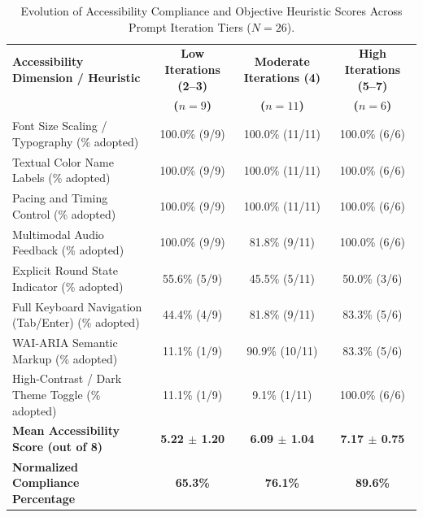 \documentclass{cleiej}
\begin{document}
\begin{table}[t]
\centering
\caption{Evolution of Accessibility Compliance and Objective Heuristic Scores Across Prompt Iteration Tiers ($N = 26$).}
\label{tab:prompt_evolution}
\small
\begin{tabularx}{\textwidth}{p{5.2cm} c c c}
\toprule
\textbf{Accessibility Dimension / Heuristic} & \textbf{Low Iterations (2--3)} & \textbf{Moderate Iterations (4)} & \textbf{High Iterations (5--7)} \\
& \textbf{($n = 9$)} & \textbf{($n = 11$)} & \textbf{($n = 6$)} \\
\midrule
Font Size Scaling / Typography (\% adopted)   & 100.0\% (9/9)   & 100.0\% (11/11) & 100.0\% (6/6) \\
Textual Color Name Labels (\% adopted)        & 100.0\% (9/9)   & 100.0\% (11/11) & 100.0\% (6/6) \\
Pacing and Timing Control (\% adopted)        & 100.0\% (9/9)   & 100.0\% (11/11) & 100.0\% (6/6) \\
Multimodal Audio Feedback (\% adopted)        & 100.0\% (9/9)   & 81.8\% (9/11)   & 100.0\% (6/6) \\
Explicit Round State Indicator (\% adopted)   & 55.6\% (5/9)    & 45.5\% (5/11)   & 50.0\% (3/6) \\
Full Keyboard Navigation (Tab/Enter) (\% adopted) & 44.4\% (4/9) & 81.8\% (9/11)  & 83.3\% (5/6) \\
WAI-ARIA Semantic Markup (\% adopted)         & 11.1\% (1/9)    & 90.9\% (10/11)  & 83.3\% (5/6) \\
High-Contrast / Dark Theme Toggle (\% adopted)& 11.1\% (1/9)    & 9.1\% (1/11)    & 100.0\% (6/6) \\
\midrule
\textbf{Mean Accessibility Score (out of 8)}   & \textbf{5.22 $\pm$ 1.20} & \textbf{6.09 $\pm$ 1.04} & \textbf{7.17 $\pm$ 0.75} \\
\textbf{Normalized Compliance Percentage}      & \textbf{65.3\%}          & \textbf{76.1\%}          & \textbf{89.6\%} \\
\bottomrule
\end{tabularx}
\end{table}
\end{document}
